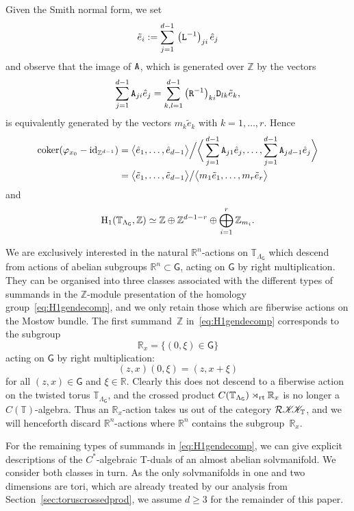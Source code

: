 \documentclass[pdftex]{sigma}
\numberwithin{equation}{section}
\newcommand{\Z}{\zed}
\newcommand{\CCK}{\mathscr{K}}
\newcommand{\sfG}{\mathsf{G}}
\newcommand{\rt}{{\rm rt}}
\newcommand{\R}{\real}
\newcommand{\zed}{{\mathbb Z}} %
\newcommand{\real}{{\mathbb R}} %
\newcommand{\torus}{{\mathbb T}} %
\begin{document}
Given the Smith normal form, we set
\begin{gather}\label{eq:tildeei}
\tilde e_i:=\sum_{j=1}^{d-1}\,\big({\tt L}^{-1}\big)_{ji}\,\hat e_j
\end{gather}
and observe that
the image of $\tt A$, which is generated over $\zed$ by the vectors
\[
\sum_{j=1}^{d-1} {\tt A}_{ji} \hat e_j=\sum_{k,l=1}^{d-1} \big({\tt
 R}^{-1}\big)_{ki} {\tt
 D}_{lk} \tilde e_k ,
\]
is equivalently generated by the
vectors $m_k \tilde e_k$ with $k=1,\ldots, r$.
Hence
\begin{align*}
{\rm{coker}}(\varphi_{x_0}-{\rm{id}}_{\Z^{d-1}})&=\big\langle \hat e_1, \ldots , \hat
e_{d-1}\big\rangle\Big/\bigg\langle \sum\limits_{j=1}^{d-1} {\tt A}_{j1} \hat e_j,\ldots,
 \sum\limits_{j=1}^{d-1} {\tt A}_{j\:\!d-1} \hat e_j\bigg\rangle\\
&=\big\langle \tilde e_1,
\ldots , \tilde e_{d-1}\big\rangle\big/\big\langle m_1 \tilde e_1,\ldots, m_r \tilde
e_r\big\rangle
\end{align*}
and
\begin{gather}\label{eq:H1gendecomp}
{\rm H}_1(\torus_{\Lambda_\sfG},\zed) \simeq \zed \oplus
\zed^{d-1-r} \oplus \bigoplus_{i=1}^r \zed_{m_i} .
\end{gather}

We are exclusively
interested in the natural $\R^n$-actions on $\torus_{\Lambda_\sfG}$ which descend
from actions of abelian subgroups $\R^n\subset\sfG$, acting on $\sfG$
by right multiplication. They can be
organised into three classes associated with the different types of
summands in the $\Z$-module presentation of the homology group~\eqref{eq:H1gendecomp}, and we only retain those which are fiberwise
actions on the Mostow bundle.
The first summand~$\Z$ in~\eqref{eq:H1gendecomp} corresponds to the subgroup
\[
\R_x = \big\{(0,\xi)\in\sfG\big\}
\]
acting on $\sfG$ by right multiplication:
\[
(z,x) (0,\xi) = (z,x+\xi)
\]
for all $(z,x)\in\sfG$ and $\xi\in\R$. Clearly this does not descend
to a fiberwise
action on the twisted torus $\torus_{\Lambda_\sfG}$, and the crossed
product $C(\torus_{\Lambda_\sfG})\rtimes_\rt\R_x$ is no longer a
$C(\torus)$-algebra. Thus an $\R_x$-action takes us out of the
category $\mathcal{R}\CCK\hspace{-1mm}\CCK_\torus$, and we will henceforth
discard $\R^n$-actions where $\R^n$ contains the subgroup~$\R_x$.

For the remaining types of summands in \eqref{eq:H1gendecomp}, we can
give explicit descriptions of the $C^*$-algebraic T-duals of an almost
abelian solvmanifold. We consider both classes in turn. As the only solvmanifolds in one and two dimensions are tori, which are
already treated by our analysis from
Section~\ref{sec:toruscrossedprod}, we assume $d\geq3$ for the
remainder of this paper.
\end{document}
